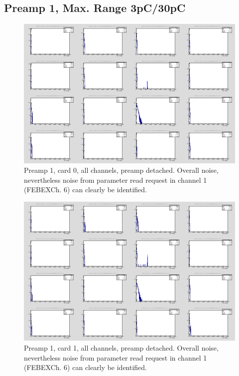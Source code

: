 \documentclass{report}
\begin{document}
\subsection{Preamp 1, Max. Range 3pC/30pC}
\begin{figure}[!htb]
  \includegraphics[width=\linewidth]{rc_bus_test/preamp1_card0_gamma_all.png}
  \caption{Preamp 1, card 0, all channels, preamp detached. Overall noise, nevertheless noise from parameter read request in channel 1 (FEBEXCh. 6) can clearly be identified.}
\end{figure}
\begin{figure}[!htb]
  \includegraphics[width=\linewidth]{rc_bus_test/preamp1_card1_gamma_all.png}
  \caption{Preamp 1, card 1, all channels, preamp detached. Overall noise, nevertheless noise from parameter read request in channel 1 (FEBEXCh. 6) can clearly be identified.}
\end{figure}
\end{document}
